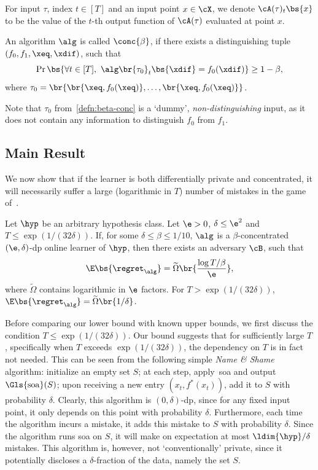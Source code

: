 For input \(\tau\), index \(t \in [T]\) and an input point \(x \in \cX\), 
we denote \(\cA(\tau)_t \bs{x}\) to be the value of the \(t\)-th output function of \(\cA(\tau)\) evaluated at point \(x\).
\begin{definition}\label{defn:beta-conc}  
    An algorithm \(\alg\) is called \(\conc{\beta}\), 
    if there exists a distinguishing tuple \((f_0, f_1, \xeq, \xdif)\), such that
    \begin{equation}
        \Pr \bs{\forall t \in [T],\ \alg \br{\tau_0}_t\bs{\xdif} = f_0(\xdif)} \geq 1 - \beta,
    \end{equation}
    where \(\tau_0 = \br{\br{\xeq, f_0(\xeq)}, \ldots, \br{\xeq, f_0(\xeq)}}\).
\end{definition}
Note that \(\tau_0\) from~\cref{defn:beta-conc} is a `dummy', \emph{non-distinguishing} input, as it does not contain any information to distinguish \(f_0\) from \(f_1\).

\subsection{Main Result}\label{sec:finite_horizon_result}
We now show that if the learner is both differentially private and concentrated, it will necessarily suffer a large (logarithmic in \(T\)) number of mistakes  in the game of~.
\begin{theorem}\label{thm:main-finite}
Let \(\hyp\) be an arbitrary hypothesis class. Let \(\e > 0\), \(\delta \leq \e^2\) and \(T \leq \exp(1 / (32\delta))\).
If, for some \(\delta \leq \beta \leq 1/10\), \(\alg\) is a \(\beta\)-concentrated \((\e, \delta)\)-\Gls{dp} online learner of \(\hyp\), then there exists an adversary \(\cB\), such that
    \begin{equation}
        \E \bs{\regret_{\alg}} = \widetilde\Omega\br{\frac{\log T / \beta}{\e}},
    \end{equation}
    where \(\widetilde \Omega\) contains logarithmic in \(\e\) factors. For \(T > \exp(1 / (32\delta))\), \(\E \bs{\regret_{\alg}} = \widetilde\Omega\br{1/\delta}\).
\end{theorem}

 Before comparing our lower bound with known upper bounds, we first discuss the condition \(T\leq \exp(1 / (32\delta))\). Our bound suggests that for sufficiently large \(T\), specifically when \(T\) exceeds \(\exp(1 / (32\delta))\), the dependency on \(T\) is in fact not needed.
This can be seen from the following simple \emph{Name \& Shame} algorithm:  initialize an empty set \(S\); at each step, apply~\Gls{soa} and output \(\mathrm{\Gls{soa}}(S)\); upon receiving a new entry \((x_t, f^\ast(x_t))\), add it to \(S\) with probability \(\delta\). Clearly, this algorithm is \((0, \delta)\)-\Gls{dp}, since for any fixed input point, it only depends on this point with probability \(\delta\).
Furthermore, each time the algorithm incurs a mistake, it adds this mistake to \(S\) with probability \(\delta\). Since the algorithm runs \Gls{soa} on \(S\), it will make on expectation at most \(\ldim{\hyp} / \delta\) mistakes.
This algorithm is, however, not `conventionally' private, since it potentially discloses a \(\delta\)-fraction of the data, namely the set \(S\).

